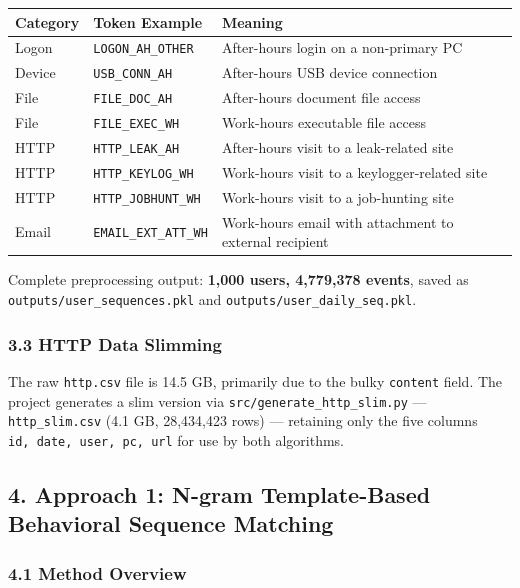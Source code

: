 \documentclass[
  a4paper,
  11pt]{article}
\newcounter{none} %
\begin{document}
{\def\LTcaptype{none} %
\begin{longtable}[]{@{}lll@{}}
\toprule\noalign{}
Category & Token Example & Meaning \\
\midrule\noalign{}
\endhead
\bottomrule\noalign{}
\endlastfoot
Logon & \texttt{LOGON\_AH\_OTHER} & After-hours login on a non-primary
PC \\
Device & \texttt{USB\_CONN\_AH} & After-hours USB device connection \\
File & \texttt{FILE\_DOC\_AH} & After-hours document file access \\
File & \texttt{FILE\_EXEC\_WH} & Work-hours executable file access \\
HTTP & \texttt{HTTP\_LEAK\_AH} & After-hours visit to a leak-related
site \\
HTTP & \texttt{HTTP\_KEYLOG\_WH} & Work-hours visit to a
keylogger-related site \\
HTTP & \texttt{HTTP\_JOBHUNT\_WH} & Work-hours visit to a job-hunting
site \\
Email & \texttt{EMAIL\_EXT\_ATT\_WH} & Work-hours email with attachment
to external recipient \\
\end{longtable}
}

Complete preprocessing output: \textbf{1,000 users, 4,779,378 events},
saved as \texttt{outputs/user\_sequences.pkl} and
\texttt{outputs/user\_daily\_seq.pkl}.

\subsubsection{3.3 HTTP Data Slimming}\label{33-http-data-slimming}

The raw \texttt{http.csv} file is 14.5 GB, primarily due to the bulky
\texttt{content} field. The project generates a slim version via
\texttt{src/generate\_http\_slim.py} --- \texttt{http\_slim.csv} (4.1
GB, 28,434,423 rows) --- retaining only the five columns
\texttt{id,\ date,\ user,\ pc,\ url} for use by both algorithms.

\subsection{4. Approach 1: N-gram Template-Based Behavioral Sequence
Matching}\label{4-approach-1-n-gram-template-based-behavioral-sequence-matching}

\subsubsection{4.1 Method Overview}\label{41-method-overview}
\end{document}
